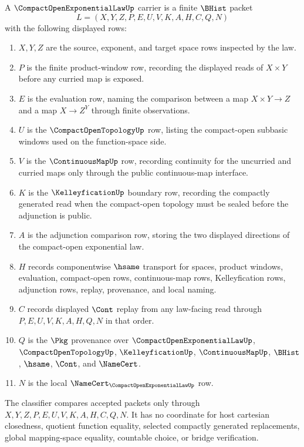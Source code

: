 \begin{definition}
\label{def:compact-open-exponential-law-carrier}
A $\CompactOpenExponentialLawUp$ carrier is a finite $\BHist$ packet
$$
L=(X,Y,Z,P,E,U,V,K,A,H,C,Q,N)
$$
with the following displayed rows:
\begin{enumerate}
\item $X,Y,Z$ are the source, exponent, and target space rows inspected by the law.
\item $P$ is the finite product-window row, recording the displayed reads of $X\times Y$ before any curried map is exposed.
\item $E$ is the evaluation row, naming the comparison between a map $X\times Y\to Z$ and a map $X\to Z^Y$ through finite observations.
\item $U$ is the $\CompactOpenTopologyUp$ row, listing the compact-open subbasic windows used on the function-space side.
\item $V$ is the $\ContinuousMapUp$ row, recording continuity for the uncurried and curried maps only through the public continuous-map interface.
\item $K$ is the $\KelleyficationUp$ boundary row, recording the compactly generated read when the compact-open topology must be sealed before the adjunction is public.
\item $A$ is the adjunction comparison row, storing the two displayed directions of the compact-open exponential law.
\item $H$ records componentwise $\hsame$ transport for spaces, product windows, evaluation, compact-open rows, continuous-map rows, Kelleyfication rows, adjunction rows, replay, provenance, and local naming.
\item $C$ records displayed $\Cont$ replay from any law-facing read through $P,E,U,V,K,A,H,Q,N$ in that order.
\item $Q$ is the $\Pkg$ provenance over $\CompactOpenExponentialLawUp$, $\CompactOpenTopologyUp$, $\KelleyficationUp$, $\ContinuousMapUp$, $\BHist$, $\hsame$, $\Cont$, and $\NameCert$.
\item $N$ is the local $\NameCert_{\CompactOpenExponentialLawUp}$ row.
\end{enumerate}
The classifier compares accepted packets only through $X,Y,Z,P,E,U,V,K,A,H,C,Q,N$. It has no coordinate for host cartesian closedness, quotient function equality, selected compactly generated replacements, global mapping-space equality, countable choice, or bridge verification.
\end{definition}

